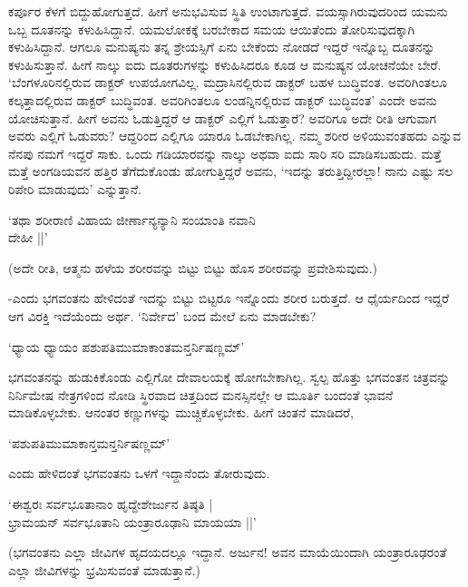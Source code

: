 ಕರ್ಪೂರ ಕೆಳಗೆ ಬಿದ್ದುಹೋಗುತ್ತದೆ. ಹೀಗೆ ಅನುಭವಿಸುವ ಸ್ಥಿತಿ ಉಂಟಾಗುತ್ತದೆ. ವಯಸ್ಸಾಗಿರುವುದರಿಂದ ಯಮನು ಒಬ್ಬ ದೂತನನ್ನು ಕಳುಹಿಸಿದ್ದಾನೆ. ಯಮಲೋಕಕ್ಕೆ ಬರಬೇಕಾದ ಸಮಯ ಆಯಿತೆಂದು ತೋರಿಸುವುದಕ್ಕಾಗಿ ಕಳುಹಿಸಿದ್ದಾನೆ. ಆಗಲೂ ಮನುಷ್ಯನು ತನ್ನ ಶ್ರೇಯಸ್ಸಿಗೆ ಏನು ಬೇಕೆಂದು ನೋಡದೆ ಇದ್ದರೆ ಇನ್ನೊಬ್ಬ ದೂತನನ್ನು ಕಳುಹಿಸುತ್ತಾನೆ. ಹೀಗೆ ನಾಲ್ಕು ಐದು ದೂತರುಗಳನ್ನು ಕಳುಹಿಸಿದರೂ ಕೂಡ ಆ ಮನುಷ್ಯನ ಯೋಚನೆಯೇ ಬೇರೆ. `ಬೆಂಗಳೂರಿನಲ್ಲಿರುವ ಡಾಕ್ಟರ್ ಉಪಯೋಗವಿಲ್ಲ. ಮದ್ರಾಸಿನಲ್ಲಿರುವ ಡಾಕ್ಟರ್ ಬಹಳ ಬುದ್ಧಿವಂತ. ಅವರಿಗಿಂತಲೂ ಕಲ್ಕತ್ತಾದಲ್ಲಿರುವ ಡಾಕ್ಟರ್ ಬುದ್ಧಿವಂತ. ಅವರಿಗಿಂತಲೂ ಲಂಡನ್ನಿನಲ್ಲಿರುವ ಡಾಕ್ಟರ್ ಬುದ್ಧಿವಂತ' ಎಂದೇ ಅವನು ಯೋಚಿಸುತ್ತಾನೆ. ಹೀಗೆ ಅವನು ಓಡುತ್ತಿದ್ದರೆ ಆ ಡಾಕ್ಟರ್ ಎಲ್ಲಿಗೆ ಓಡುತ್ತಾರೆ? ಅವರಿಗೂ ಅದೇ ರೀತಿ ಆಗುವಾಗ ಅವರು ಎಲ್ಲಿಗೆ ಓಡುವರು? ಆದ್ದರಿಂದ ಎಲ್ಲಿಗೂ ಯಾರೂ ಓಡಬೇಕಾಗಿಲ್ಲ. ನಮ್ಮ ಶರೀರ ಅಳಿಯುವಂತಹದು ಎನ್ನುವ ನೆನಪು ನಮಗೆ ಇದ್ದರೆ ಸಾಕು. ಒಂದು ಗಡಿಯಾರವನ್ನು ನಾಲ್ಕು ಅಥವಾ ಐದು ಸಾರಿ ಸರಿ ಮಾಡಿಸಬಹುದು. ಮತ್ತೆ ಮತ್ತೆ ಅಂಗಡಿಯವನ ಹತ್ತಿರ ತೆಗೆದುಕೊಂಡು ಹೋಗುತ್ತಿದ್ದರೆ ಅವನು, `ಇದನ್ನು ತರುತ್ತಿದ್ದೀರಲ್ಲಾ! ನಾನು ಎಷ್ಟು ಸಲ ರಿಪೇರಿ ಮಾಡುವುದು' ಎನ್ನುತ್ತಾನೆ.

\begin{shloka}
`ತಥಾ ಶರೀರಾಣಿ ವಿಹಾಯ ಜೀರ್ಣಾನ್ಯನ್ಯಾನಿ ಸಂಯಾಂತಿ ನವಾನಿ\\
\hspace{5.5cm} ದೇಹೀ ||'
\end{shloka}

(ಅದೇ ರೀತಿ, ಆತ್ಮನು ಹಳೆಯ ಶರೀರವನ್ನು ಬಿಟ್ಟು ಬಿಟ್ಟು ಹೊಸ ಶರೀರವನ್ನು ಪ್ರವೇಶಿಸುವುದು.)


-ಎಂದು ಭಗವಂತನು ಹೇಳಿದಂತೆ ಇದನ್ನು ಬಿಟ್ಟು ಬಿಟ್ಟರೂ ಇನ್ನೊಂದು ಶರೀರ ಬರುತ್ತದೆ. ಆ ಧೈರ್ಯದಿಂದ ಇದ್ದರೆ ಆಗ ವಿರಕ್ತಿ ಇದೆಯೆಂದು ಅರ್ಥ. `ನಿರ್ವೇದ' ಬಂದ ಮೇಲೆ ಏನು ಮಾಡಬೇಕು?

\begin{shloka}
`ಧ್ಯಾಯ ಧ್ಯಾಯಂ ಪಶುಪತಿಮುಮಾಕಾಂತಮನ್ತರ್ನಿಷಣ್ಣಮ್'
\end{shloka}

ಭಗವಂತನನ್ನು ಹುಡುಕಿಕೊಂಡು ಎಲ್ಲಿಗೋ ದೇವಾಲಯಕ್ಕೆ ಹೋಗಬೇಕಾಗಿಲ್ಲ. ಸ್ವಲ್ಪ ಹೊತ್ತು ಭಗವಂತನ ಚಿತ್ರವನ್ನು ನಿರ್ನಿಮೇಷ ನೇತ್ರಗಳಿಂದ ನೋಡಿ ಸ್ಥಿರವಾದ ಚಿತ್ತದಿಂದ ಮನಸ್ಸಿನಲ್ಲೇ ಆ ಮೂರ್ತಿ ಬಂದಂತೆ ಭಾವನೆ ಮಾಡಿಕೊಳ್ಳಬೇಕು. ಆನಂತರ ಕಣ್ಣುಗಳನ್ನು ಮುಚ್ಚಿಕೊಳ್ಳಬೇಕು. ಹೀಗೆ ಚಿಂತನೆ ಮಾಡಿದರೆ,

\begin{shloka}
`ಪಶುಪತಿಮುಮಾಕಾನ್ತಮನ್ತರ್ನಿಷಣ್ಣಮ್'
\end{shloka}

ಎಂದು ಹೇಳಿದಂತೆ ಭಗವಂತನು ಒಳಗೆ ಇದ್ದಾನೆಂದು ತೋರುವುದು.

\begin{shloka}
`ಈಶ್ವರಃ ಸರ್ವಭೂತಾನಾಂ ಹೃದ್ದೇಶೇರ್ಜುನ ತಿಷ್ಠತಿ |\\
ಭ್ರಾಮಯನ್ ಸರ್ವಭೂತಾನಿ ಯಂತ್ರಾರೂಢಾನಿ ಮಾಯಯಾ ||'
\end{shloka}

(ಭಗವಂತನು ಎಲ್ಲಾ ಜೀವಿಗಳ ಹೃದಯದಲ್ಲೂ ಇದ್ದಾನೆ. ಅರ್ಜುನ! ಅವನ ಮಾಯೆಯಿಂದಾಗಿ ಯಂತ್ರಾರೂಢರಂತೆ ಎಲ್ಲಾ ಜೀವಿಗಳನ್ನು ಭ್ರಮಿಸುವಂತೆ ಮಾಡುತ್ತಾನೆ.)

